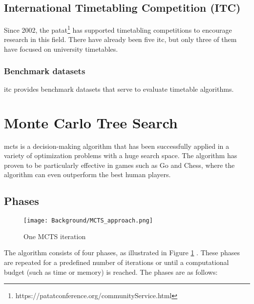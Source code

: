 \subsection{International Timetabling Competition (ITC)}

Since 2002, the \ac{patat}\footnote{https://patatconference.org/communityService.html} has supported timetabling competitions to encourage research in this field. There have already been five \ac{itc}, but only three of them have focused on university timetables.

\subsubsection{Benchmark datasets}

\ac{itc} provides benchmark datasets that serve to evaluate timetable algorithms. %

\section{Monte Carlo Tree Search}

\ac{mcts} is a decision-making algorithm that has been successfully applied in a variety of optimization problems with a huge search space. The algorithm has proven to be particularly effective in games such as Go and Chess, where the algorithm can even outperform the best human players.

\subsection{Phases}

\begin{figure}
      \centering
      \texttt{[image: Background/MCTS\_approach.png]}
      \caption[MCTS approach]
      {One MCTS iteration \cite{browne_survey_2012}}
      \label{fig:mcts_approach}
\end{figure}

The algorithm consists of four phases, as illustrated in Figure \ref{fig:mcts_approach}  \cite{browne_survey_2012}. These phases are repeated for a predefined number of iterations or until a computational budget (such as time or memory) is reached. The phases are as follows:


